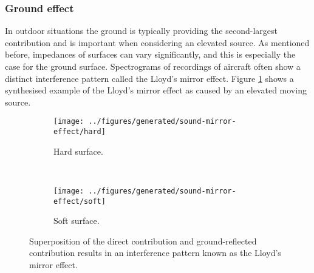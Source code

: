 
\subsubsection*{Ground effect}
In outdoor situations the ground is typically providing the second-largest
contribution and is important when considering an elevated source. As mentioned
before, impedances of surfaces can vary significantly, and this is especially
the case for the ground surface. Spectrograms of recordings of aircraft often
show a distinct interference pattern called the Lloyd's mirror effect. Figure
\ref{fig:theory:sound:reflection:ground} shows a synthesised example of the
Lloyd's mirror effect as caused by an elevated moving source.

\begin{figure}
    \begin{subfigure}{\textwidth}
        \texttt{[image: ../figures/generated/sound-mirror-effect/hard]}
        \caption{Hard surface.}
    \end{subfigure}
    ~
    \begin{subfigure}{\textwidth}
        \texttt{[image: ../figures/generated/sound-mirror-effect/soft]}
        \caption{Soft surface.}
    \end{subfigure}
    \caption{Superposition of the direct contribution and ground-reflected contribution results in an interference pattern known as the Lloyd's mirror effect.}
    \label{fig:theory:sound:reflection:ground}
\end{figure}

